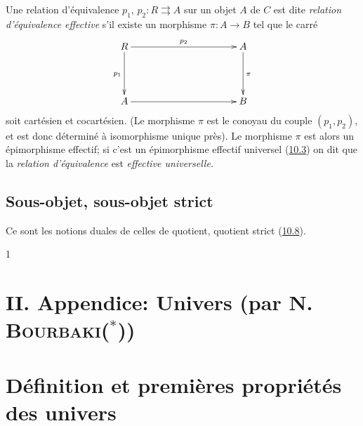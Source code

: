 \documentclass[10pt]{../fichiers-configuration-latex/smfart}
\begin{document}
Une relation d'équivalence $p_1$, $p_2:R\rightrightarrows A$ sur un
objet $A$ de $C$ est dite \emph{relation d'équivalence effective}
s'il existe un morphisme $\pi:A\rightarrow B$ tel que le carré
\[
\xymatrix@C=3.75cm@R=1.5cm{
R\ar[r]^{p_2} \ar[d]_{p_1}& A \ar[d]^{\pi}\\
A\ar[r] & B }
\]
soit cartésien et cocartésien. (Le morphisme $\pi$ est le conoyau du
couple $(p_1,p_2)$, et est donc déterminé à isomorphisme unique
près). Le morphisme $\pi$ est alors un épimorphisme effectif; si
c'est un épimorphisme effectif universel (\hyperref[I.sec10.3]{10.3}) on dit que la
\emph{relation d'équivalence} est \emph{effective universelle.}

\subsection{Sous-objet, sous-objet strict}

\etc Ce sont les notions duales de celles de quotient, quotient
strict \etc (\hyperref[I.sec10.8]{10.8}).

\begin{thebibliography}{1}
 
\end{thebibliography}


\newpage

\section*{II. Appendice: Univers (par
  N. \textsc{Bourbaki}($^*$))}\pageoriginale

\setcounter{section}{0}
\section{Définition et premières propriétés des univers}
\end{document}
